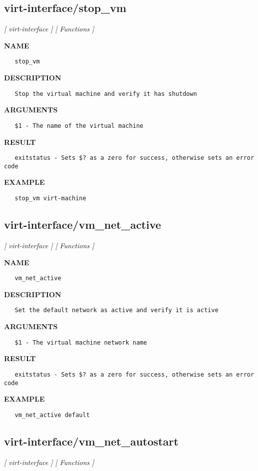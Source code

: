 \subsection{virt-interface/stop\_vm}
\textsl{[ virt-interface ]}
\textsl{[ Functions ]}

\label{ch:robo40}
\label{ch:virt_interface_stop_vm}
\textbf{NAME}
\begin{verbatim}
   stop_vm
\end{verbatim}
\textbf{DESCRIPTION}
\begin{verbatim}
   Stop the virtual machine and verify it has shutdown
\end{verbatim}
\textbf{ARGUMENTS}
\begin{verbatim}
   $1 - The name of the virtual machine
\end{verbatim}
\textbf{RESULT}
\begin{verbatim}
   exitstatus - Sets $? as a zero for success, otherwise sets an error code
\end{verbatim}
\textbf{EXAMPLE}
\begin{verbatim}
   stop_vm virt-machine
\end{verbatim}
\newpage
\subsection{virt-interface/vm\_net\_active}
\textsl{[ virt-interface ]}
\textsl{[ Functions ]}

\label{ch:robo41}
\label{ch:virt_interface_vm_net_active}
\textbf{NAME}
\begin{verbatim}
   vm_net_active
\end{verbatim}
\textbf{DESCRIPTION}
\begin{verbatim}
   Set the default network as active and verify it is active
\end{verbatim}
\textbf{ARGUMENTS}
\begin{verbatim}
   $1 - The virtual machine network name
\end{verbatim}
\textbf{RESULT}
\begin{verbatim}
   exitstatus - Sets $? as a zero for success, otherwise sets an error code
\end{verbatim}
\textbf{EXAMPLE}
\begin{verbatim}
   vm_net_active default
\end{verbatim}
\newpage
\subsection{virt-interface/vm\_net\_autostart}
\textsl{[ virt-interface ]}
\textsl{[ Functions ]}

